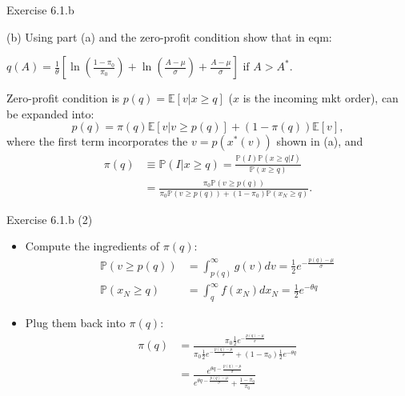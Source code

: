 \documentclass[english,10pt
,aspectratio=169
]{beamer}
\begin{document}
\begin{frame}{Exercise 6.1.b}
	\begin{exampleblock}{}
		(b) Using part (a) and the zero-profit condition show that in eqm:
		\begin{center}
			$
			q(A)=\frac{1}{\theta} \left[\ln \left(\frac{1-\pi_0}{\pi_0}\right) + \ln \left(\frac{A-\mu}{\sigma}\right) + \frac{A-\mu}{\sigma}\right]\text{ if } A>A^*.
			$
		\end{center}
	\end{exampleblock}

	\pause
	Zero-profit condition is $p(q) = \mathbb{E} [v | x \geq q]$ ($x$ is the incoming mkt order), can be expanded into:
	\[
		p(q) = \pi(q) \mathbb{E}[v|v \ge p(q)]+(1-\pi(q))\mathbb{E}[v],
	\]
	where the first term incorporates the $v=p(x^*(v))$ shown in (a), and
	\begin{align*}
		\pi(q) &\equiv \mathbb{P}(I|x \geq q) = \frac{\mathbb{P}(I)\mathbb{P}(x \geq q|I) }{\mathbb{P}(x \geq q)} 
		\\
		&= \frac{\pi_0 \mathbb{P}(v \ge p(q))}{\pi_0 \mathbb{P}(v \ge p(q))+(1-\pi_0)\mathbb{P}(x_N \ge q)}.
	\end{align*}
\end{frame}


\begin{frame}{Exercise 6.1.b (2)}
	\begin{itemize}
		\item Compute the ingredients of $\pi(q)$:
		\begin{align*}
			\mathbb{P}(v \ge p(q)) 	&=\int_{p(q)}^\infty g(v) dv = \frac{1}{2} e^{-\frac{p(q)-\mu}{\sigma}} \\
			\mathbb{P}(x_N \ge q)	&=\int_q^\infty f(x_N) dx_N = \frac{1}{2}e^{-\theta q}
		\end{align*}
		\item Plug them back into $\pi(q)$:
		\begin{align*}
			\pi(q)
			& =\frac{\pi_0 \frac{1}{2} e^{-\frac{p(q)-\mu}{\sigma}}}{\pi_0 \frac{1}{2} e^{-\frac{p(q)-\mu}{\sigma}} + (1-\pi_0)\frac{1}{2}e^{-\theta q}} 
			\\
			& = \frac{e^{\theta q-\frac{p(q)-\mu}{\sigma}}}{e^{\theta q-\frac{p(q)-\mu }{\sigma}} + \frac{1-\pi_0}{\pi_0}} 
		\end{align*}
	\end{itemize}
\end{frame}
\end{document}
